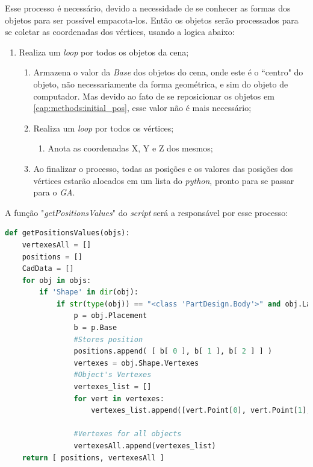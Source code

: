 Esse processo é necessário, devido a necessidade de se conhecer as formas dos objetos para ser possível empacota-los. Então os objetos serão processados para se coletar as coordenadas dos vértices, usando a logica abaixo:

\begin{enumerate}
    \item Realiza um \textit{loop} por todos os objetos da cena;
    \begin{enumerate}
        \item Armazena o valor da \textit{Base} dos objetos do cena, onde este é o ``centro" do objeto, não necessariamente da forma geométrica, e sim do objeto de computador. Mas devido ao fato de se reposicionar os objetos em \ref{cap:methods:initial_pos}, esse valor não é mais necessário; 
        \item Realiza um \textit{loop} por todos os vértices;
        \begin{enumerate}
            \item Anota as coordenadas X, Y e Z dos mesmos;
        \end{enumerate}
        \item Ao finalizar o processo, todas as posições e os valores das posições dos vértices estarão alocados em um lista do \textit{python}, pronto para se passar para o \textit{GA}.
    \end{enumerate}
\end{enumerate}

A função "\textit{getPositionsValues}" do \textit{script} \cite{code:FreeCad_Miner} será a responsável por esse processo:

\begin{lstlisting}[language=Python, breaklines, caption = \textit{getPositionsValues}, captionpos=b]
def getPositionsValues(objs):
    vertexesAll = []
    positions = []
    CadData = []
    for obj in objs:
        if 'Shape' in dir(obj):
            if str(type(obj)) == "<class 'PartDesign.Body'>" and obj.Label != "Board Body":
                p = obj.Placement
                b = p.Base
                #Stores position
                positions.append( [ b[ 0 ], b[ 1 ], b[ 2 ] ] )
                vertexes = obj.Shape.Vertexes
                #Object's Vertexes
                vertexes_list = []
                for vert in vertexes:
                    vertexes_list.append([vert.Point[0], vert.Point[1], vert.Point[2]])
                    
                #Vertexes for all objects
                vertexesAll.append(vertexes_list)
    return [ positions, vertexesAll ]
\end{lstlisting}

